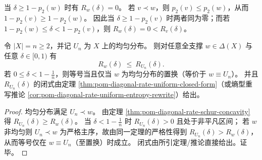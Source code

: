 \begin{remark}[零速率区间的等号情形]\label{rem:pom-diagonal-rate-zero-rate-majorization}
当 \(\delta\ge 1-p_2(w)\) 时有 \(R_w(\delta)=0\)。
若 \(v\prec w\)，则 \(p_2(v)\le p_2(w)\)，从而 \(1-p_2(v)\ge 1-p_2(w)\)。
因此当 \(\delta\ge 1-p_2(v)\) 时两者同为零；而若 \(1-p_2(w)\le\delta<1-p_2(v)\)，则 \(R_w(\delta)=0<R_v(\delta)\)。
\end{remark}

\begin{corollary}[均匀极大与闭式上界]\label{cor:pom-diagonal-rate-uniform-global-max}
令 \(|X|=n\ge 2\)，并记 \(U_n\) 为 \(X\) 上的均匀分布。
则对任意全支撑 \(w\in\Delta(X)\) 与任意 \(\delta\in[0,1)\) 有
\[
R_w(\delta)\ \le\ R_{U_n}(\delta).
\]
若 \(0\le\delta<1-\tfrac1n\)，则等号当且仅当 \(w\) 为均匀分布的置换（等价于 \(w\equiv U_n\)）。
并且 \(R_{U_n}(\delta)\) 的闭式由定理 \ref{thm:pom-diagonal-rate-uniform-closed-form}（或熵型重写推论 \ref{cor:pom-diagonal-rate-uniform-entropy-rewrite}）给出。
\end{corollary}
\begin{proof}
均匀分布满足 \(U_n\prec w\)。
由定理 \ref{thm:pom-diagonal-rate-schur-concavity} 得 \(R_{U_n}(\delta)\ge R_w(\delta)\)。
当 \(\delta<1-\tfrac1n\) 时 \(R_{U_n}(\delta)>0\) 且处于非平凡区间；
若 \(w\) 非均匀则 \(U_n\prec w\) 为严格主序，故由同一定理的严格性得到 \(R_{U_n}(\delta)>R_w(\delta)\)，从而等号仅在 \(w\equiv U_n\)（至置换）时成立。
闭式由所引定理/推论直接给出。证毕。
\end{proof}

